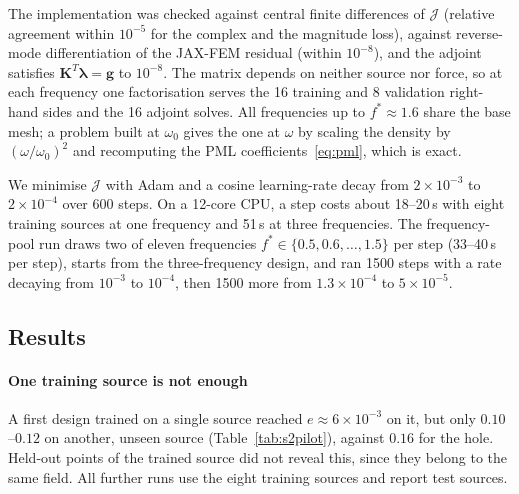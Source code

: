 \documentclass[preprint,12pt]{elsarticle}
\newcommand{\mbf}[1]{\mathbf{#1}}
\begin{document}
The implementation was checked against central finite differences of $\mathcal{J}$ (relative agreement within $10^{-5}$ for the
complex and the magnitude loss), against reverse-mode differentiation of the JAX-FEM residual (within $10^{-8}$), and the adjoint
satisfies $\mbf{K}^T\boldsymbol{\lambda}=\mbf{g}$ to $10^{-8}$. The matrix depends on neither source nor force, so at each frequency one
factorisation serves the 16 training and 8 validation right-hand sides and the 16 adjoint solves. All frequencies up to
$f^*\approx1.6$ share the base mesh; a problem built at $\omega_0$ gives the one at $\omega$ by scaling the density by $(\omega/\omega_0)^2$
and recomputing the PML coefficients~\eqref{eq:pml}, which is exact.

We minimise $\mathcal{J}$ with Adam and a cosine learning-rate decay from $2\times10^{-3}$ to $2\times10^{-4}$ over 600 steps. On a
12-core CPU, a step costs about 18--20\,s with eight training sources at one frequency and 51\,s at three frequencies. The
frequency-pool run draws two of eleven frequencies $f^*\in\{0.5,0.6,\dots,1.5\}$ per step (33--40\,s per step), starts from the
three-frequency design, and ran 1500 steps with a rate decaying from $10^{-3}$ to $10^{-4}$, then 1500 more from $1.3\times10^{-4}$ to
$5\times10^{-5}$.

\FloatBarrier
\subsection{Results}

\paragraph{One training source is not enough} A first design trained on a single source reached $e\approx6\times10^{-3}$ on it, but only
$0.10$--$0.12$ on another, unseen source (Table~\ref{tab:s2pilot}), against $0.16$ for the hole. Held-out points of the trained source did not reveal this,
since they belong to the same field. All further runs use the eight training sources and report test sources.

\begin{table}[!htb]
\centering\small
\caption{Design trained on one source only, $f^*=1$, 500 pixels, 150 steps.}
\label{tab:s2pilot}

\end{table}
\end{document}
